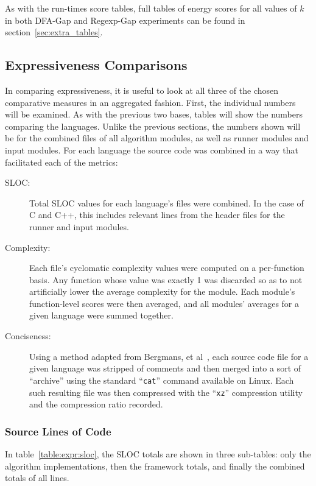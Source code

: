 As with the run-times score tables, full tables of energy scores for all values of $k$ in both DFA-Gap and Regexp-Gap experiments can be found in section~\ref{sec:extra_tables}.

\subsection{Expressiveness Comparisons}
\label{subsec:expr_comp}

In comparing expressiveness, it is useful to look at all three of the chosen comparative measures in an aggregated fashion. First, the individual numbers will be examined. As with the previous two bases, tables will show the numbers comparing the languages. Unlike the previous sections, the numbers shown will be for the combined files of all algorithm modules, as well as runner modules and input modules. For each language the source code was combined in a way that facilitated each of the metrics:

\begin{description}
\item[SLOC:] Total SLOC values for each language's files were combined. In the case of C and C++, this includes relevant lines from the header files for the runner and input modules.
\item[Complexity:] Each file's cyclomatic complexity values were computed on a per-function basis. Any function whose value was exactly 1 was discarded so as to not artificially lower the average complexity for the module. Each module's function-level scores were then averaged, and all modules' averages for a given language were summed together.
\item[Conciseness:] Using a method adapted from Bergmans, et al~\cite{bergmans}, each source code file for a given language was stripped of comments and then merged into a sort of ``archive'' using the standard ``\texttt{cat}'' command available on Linux. Each such resulting file was then compressed with the ``\texttt{xz}'' compression utility and the compression ratio recorded.
\end{description}

\subsubsection{Source Lines of Code}

In table~\ref{table:expr:sloc}, the SLOC totals are shown in three sub-tables: only the algorithm implementations, then the framework totals, and finally the combined totals of all lines.

